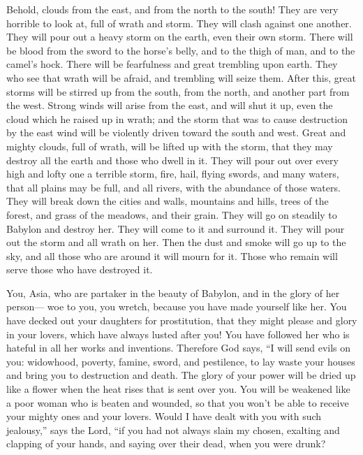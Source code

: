  Behold, clouds from the east, and from the north to the
south! They are very horrible to look at, full of wrath and storm.
 They will clash against one another. They will pour out a
heavy storm on the earth, even their own storm. There will be blood from
the sword to the horse's belly,  and to the thigh of man,
and to the camel's hock.  There will be fearfulness and
great trembling upon earth. They who see that wrath will be afraid, and
trembling will seize them.  After this, great storms will
be stirred up from the south, from the north, and another part from the
west.  Strong winds will arise from the east, and will shut
it up, even the cloud which he raised up in wrath; and the storm that
was to cause destruction by the east wind will be violently driven
toward the south and west.  Great and mighty clouds, full
of wrath, will be lifted up with the storm, that they may destroy all
the earth and those who dwell in it. They will pour out over every high
and lofty one a terrible storm,  fire, hail, flying swords,
and many waters, that all plains may be full, and all rivers, with the
abundance of those waters.  They will break down the cities
and walls, mountains and hills, trees of the forest, and grass of the
meadows, and their grain.  They will go on steadily to
Babylon and destroy her.  They will come to it and surround
it. They will pour out the storm and all wrath on her. Then the dust and
smoke will go up to the sky, and all those who are around it will mourn
for it.  Those who remain will serve those who have
destroyed it.

 You, Asia, who are partaker in the beauty of Babylon, and
in the glory of her person---  woe to you, you wretch,
because you have made yourself like her. You have decked out your
daughters for prostitution, that they might please and glory in your
lovers, which have always lusted after you!  You have
followed her who is hateful in all her works and inventions. Therefore
God says,  ``I will send evils on you: widowhood, poverty,
famine, sword, and pestilence, to lay waste your houses and bring you to
destruction and death.  The glory of your power will be
dried up like a flower when the heat rises that is sent over you.
 You will be weakened like a poor woman who is beaten and
wounded, so that you won't be able to receive your mighty ones and your
lovers.  Would I have dealt with you with such jealousy,''
says the Lord,  ``if you had not always slain my chosen,
exalting and clapping of your hands, and saying over their dead, when
you were drunk?

